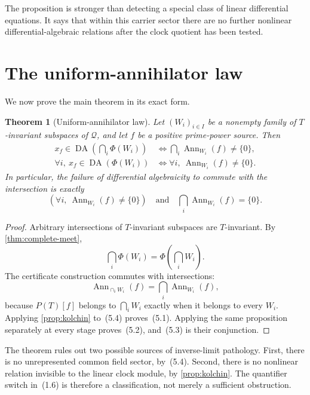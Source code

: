 \documentclass[11pt]{article}
\newtheorem{theorem}{Theorem}[section]
\theoremstyle{definition}
\theoremstyle{remark}
\newcommand{\Q}{\mathcal Q}
\newcommand{\DA}{\operatorname{DA}}
\newcommand{\Ann}{\operatorname{Ann}}
\begin{document}
The proposition is stronger than detecting a special class of linear differential equations.  It
says that within this carrier sector there are no further nonlinear differential-algebraic
relations after the clock quotient has been tested.

\section{The uniform-annihilator law}\label{sec:uniform}

We now prove the main theorem in its exact form.

\begin{theorem}[Uniform-annihilator law]\label{thm:uniform}
Let $(W_i)_{i\in I}$ be a nonempty family of $T$-invariant subspaces of $\Q$, and let $f$ be a
positive prime-power source.  Then
\begin{align}
 x_f\in\DA\!\left(\bigcap_i\Phi(W_i)\right)
 &\Longleftrightarrow
 \bigcap_i\Ann_{W_i}(f)\ne\{0\},                               \tag{5.1}\\
 \forall i,\ x_f\in\DA(\Phi(W_i))
 &\Longleftrightarrow
 \forall i,\ \Ann_{W_i}(f)\ne\{0\}.                            \tag{5.2}
\end{align}
In particular, the failure of differential algebraicity to commute with the intersection is
exactly
\[
  \left(\forall i,\ \Ann_{W_i}(f)\ne\{0\}\right)
  \quad\text{and}\quad
  \bigcap_i\Ann_{W_i}(f)=\{0\}.                                \tag{5.3}
\]
\end{theorem}

\begin{proof}
Arbitrary intersections of $T$-invariant subspaces are $T$-invariant.  By
\cref{thm:complete-meet},
\[
  \bigcap_i\Phi(W_i)=\Phi\!\left(\bigcap_iW_i\right).           \tag{5.4}
\]
The certificate construction commutes with intersections:
\[
  \Ann_{\cap_iW_i}(f)=\bigcap_i\Ann_{W_i}(f),                   \tag{5.5}
\]
because $P(T)[f]$ belongs to $\bigcap_iW_i$ exactly when it belongs to every $W_i$.  Applying
\cref{prop:kolchin} to~(5.4) proves~(5.1).  Applying the same proposition separately at every
stage proves~(5.2), and~(5.3) is their conjunction.
\end{proof}

The theorem rules out two possible sources of inverse-limit pathology.  First, there is no
unrepresented common field sector, by~(5.4).  Second, there is no nonlinear relation invisible to
the linear clock module, by \cref{prop:kolchin}.  The quantifier switch in~(1.6) is therefore a
classification, not merely a sufficient obstruction.
\end{document}
